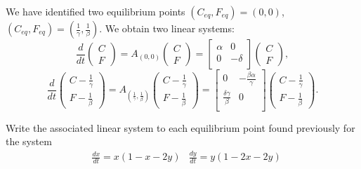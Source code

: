 We have identified two equilibrium points $(C_{eq},F_{eq}) = (0,0)$, $(C_{eq},F_{eq}) = (\frac{1}{\gamma},\frac{1}{\beta})$. We obtain two linear systems:
\[ 
\displaystyle \frac{d }{dt} \begin{pmatrix}
C \\F 
\end{pmatrix} = A_{(0,0)} \begin{pmatrix}
C\\F
\end{pmatrix} = \displaystyle  \begin{bmatrix}
\alpha & 0 \\
0&-\delta \\
\end{bmatrix} \begin{pmatrix}
C\\F
\end{pmatrix},
\]
\[ \displaystyle \frac{d }{dt} \begin{pmatrix}
C - \frac{1}{\gamma} \\F - \frac{1}{\beta} 
\end{pmatrix} = A_{(\frac{1}{\gamma},\frac{1}{\beta})}  \begin{pmatrix}
C - \frac{1}{\gamma} \\F - \frac{1}{\beta} 
\end{pmatrix} =   \begin{bmatrix}
0& \displaystyle- \frac{\beta \alpha }{\gamma} \\
 \displaystyle\frac{\delta \gamma}{\beta}&0\\
\end{bmatrix}  \begin{pmatrix}
C - \frac{1}{\gamma} \\F - \frac{1}{\beta} 
\end{pmatrix} .\]

 \begin{Exercise}
Write the associated linear system to each equilibrium point found previously for the system
\[ \begin{aligned}
&\displaystyle \frac{dx}{dt} = x \left( 1 -x - 2y \right)  
&\displaystyle \frac{dy}{dt} = y \left( 1 -2x -2 y \right) 
\end{aligned}
\]
  \dotfill

\dotfill

\dotfill

\dotfill

\dotfill

\dotfill

\dotfill

\dotfill

\dotfill

\dotfill
 \end{Exercise}

